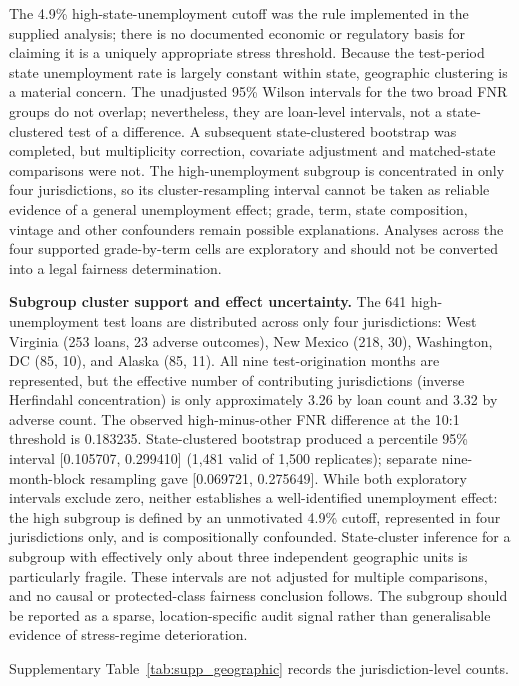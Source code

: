 \documentclass[10pt]{article}
\begin{document}
The 4.9\% high-state-unemployment cutoff was the rule implemented in the supplied analysis; there is no documented economic or regulatory basis for claiming it is a uniquely appropriate stress threshold. Because the test-period state unemployment rate is largely constant within state, geographic clustering is a material concern. The unadjusted 95\% Wilson intervals for the two broad FNR groups do not overlap; nevertheless, they are loan-level intervals, not a state-clustered test of a difference. A subsequent state-clustered bootstrap was completed, but multiplicity correction, covariate adjustment and matched-state comparisons were not. The high-unemployment subgroup is concentrated in only four jurisdictions, so its cluster-resampling interval cannot be taken as reliable evidence of a general unemployment effect; grade, term, state composition, vintage and other confounders remain possible explanations. Analyses across the four supported grade-by-term cells are exploratory and should not be converted into a legal fairness determination.

\noindent\textbf{Subgroup cluster support and effect uncertainty.} The 641 high-unemployment test loans are distributed across only four jurisdictions: West Virginia (253 loans, 23 adverse outcomes), New Mexico (218, 30), Washington, DC (85, 10), and Alaska (85, 11). All nine test-origination months are represented, but the effective number of contributing jurisdictions (inverse Herfindahl concentration) is only approximately 3.26 by loan count and 3.32 by adverse count. The observed high-minus-other FNR difference at the 10:1 threshold is 0.183235. State-clustered bootstrap produced a percentile 95\% interval [0.105707, 0.299410] (1,481 valid of 1,500 replicates); separate nine-month-block resampling gave [0.069721, 0.275649]. While both exploratory intervals exclude zero, neither establishes a well-identified unemployment effect: the high subgroup is defined by an unmotivated 4.9\% cutoff, represented in four jurisdictions only, and is compositionally confounded. State-cluster inference for a subgroup with effectively only about three independent geographic units is particularly fragile. These intervals are not adjusted for multiple comparisons, and no causal or protected-class fairness conclusion follows. The subgroup should be reported as a sparse, location-specific audit signal rather than generalisable evidence of stress-regime deterioration.

Supplementary Table~\ref{tab:supp_geographic} records the jurisdiction-level counts.
\end{document}
